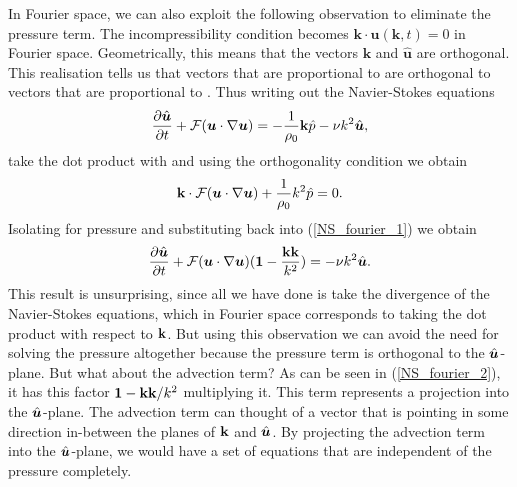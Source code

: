 In Fourier space, we can also exploit the following observation to eliminate the pressure term. The incompressibility condition becomes $\textbf{k}\cdot\hat{\bm{u}}(\textbf{k},t)=0$ in Fourier space. Geometrically, this means that the vectors $\textbf{k}$ and $\hat{\bm{u}}$ are orthogonal.  
This realisation tells us that vectors that are proportional to \uhatm are orthogonal to vectors that are proportional to \kvecm. Thus writing out the Navier-Stokes equations
\begin{align}
\frac{\partial \hat{\bm{u}}}{\partial t} + \mathcal{F}(\bm{u}\cdot\nabla\bm{u}) = -\frac{1}{\rho_{0}} \textbf{k}\hat{p} - \nu k^{2}\hat{\bm{u}}\label{NS_fourier_1},
\end{align}
take the dot product with \kvecm and using the orthogonality condition we obtain
\begin{align}
\textbf{k}\cdot\mathcal{F}(\bm{u}\cdot\nabla\bm{u}) + \frac{1}{\rho_{0}}k^{2}\hat{p}=0\label{pressure_fourier_1}.
\end{align}
Isolating for pressure and substituting back into (\ref{NS_fourier_1}) we obtain
\begin{align}
\frac{\partial \hat{\bm{u}}}{\partial t} + \mathcal{F}(\bm{u}\cdot\nabla\bm{u})(\textbf{1}-\frac{\textbf{k}\textbf{k}}{k^{2}})= - \nu k^{2}\hat{\bm{u}}\label{NS_fourier_2}.
\end{align}
This result is unsurprising, since all we have done is take the divergence of the Navier-Stokes equations, which in Fourier space corresponds to taking the dot product with respect to $\textbf{k}$. But using this observation we can avoid the need for solving the pressure altogether because the pressure term is orthogonal to the $\hat{\bm{u}}$-plane. But what about the advection term? As can be seen in (\ref{NS_fourier_2}), it has this factor $\textbf{1} - \textbf{k}\textbf{k}/k^{2}$ multiplying it. This term represents a projection into the $\hat{\bm{u}}$-plane. The advection term can thought of a vector that is pointing in some direction in-between the planes of $\textbf{k}$ and $\hat{\bm{u}}$. By projecting the advection term into the $\hat{\bm{u}}$-plane, we would have a set of equations that are independent of the pressure completely.

